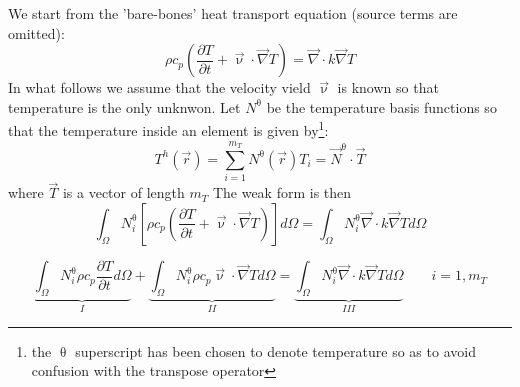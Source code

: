 We start from the 'bare-bones' heat transport equation (source terms are omitted): 
\begin{equation}
\rho c_p \left( \frac{\partial T}{\partial t} + {\vec \upnu}\cdot {\vec\nabla T} \right)
= {\vec \nabla} \cdot k \vec\nabla T 
\end{equation}
In what follows we assume that the velocity vield $\vec \upnu$ is known so that temperature is the 
only unknwon.
Let $N^\uptheta$ be the temperature basis functions so that the temperature inside an element is 
given by\footnote{the $\uptheta$ superscript has been chosen to denote temperature so as to avoid confusion
with the transpose operator}:
\begin{equation}
T^h({\vec r}) = \sum_{i=1}^{m_T} N^\uptheta ({\vec r}) T_i = \vec N^\uptheta \cdot \vec T
\end{equation}
where $\vec T$ is a vector of length $m_T$
The weak form is then 
\begin{equation}
\int_\Omega N^\uptheta_i \left[ 
\rho c_p \left( \frac{\partial T}{\partial t} + {\vec \upnu}\cdot {\vec\nabla T} \right) \right] d\Omega
= \int_\Omega  N^\uptheta_i {\vec \nabla} \cdot k \vec\nabla T  d\Omega
\end{equation}

\[
\underbrace{\int_\Omega N^\uptheta_i  \rho c_p \frac{\partial T}{\partial t} d\Omega}_{I}
+ \underbrace{\int_\Omega N^\uptheta_i  \rho c_p  {\vec \upnu}\cdot {\vec\nabla T}   d\Omega}_{II}
= \underbrace{\int_\Omega  N^\uptheta_i {\vec \nabla} \cdot k \vec\nabla T d\Omega}_{III}
\quad\quad
i=1,m_T
\]

